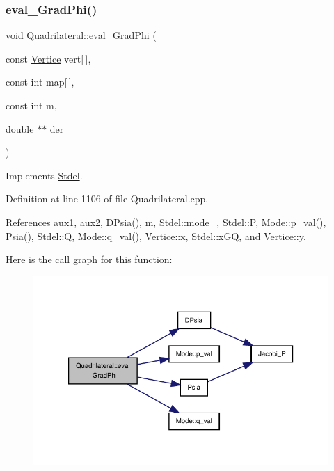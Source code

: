 \subsubsection{\texorpdfstring{eval\+\_\+\+Grad\+Phi()}{eval\_GradPhi()}}
{\footnotesize\ttfamily void Quadrilateral\+::eval\+\_\+\+Grad\+Phi (\begin{DoxyParamCaption}\item[{const \hyperlink{structVertice}{Vertice}}]{vert\mbox{[}$\,$\mbox{]},  }\item[{const int}]{map\mbox{[}$\,$\mbox{]},  }\item[{const int}]{m,  }\item[{double $\ast$$\ast$}]{der }\end{DoxyParamCaption})\hspace{0.3cm}{\ttfamily [virtual]}}



Implements \hyperlink{classStdel_a83a7a53e4be6da7c3a615967e4504b07}{Stdel}.



Definition at line 1106 of file Quadrilateral.\+cpp.



References aux1, aux2, D\+Psia(), m, Stdel\+::mode\+\_\+, Stdel\+::P, Mode\+::p\+\_\+val(), Psia(), Stdel\+::Q, Mode\+::q\+\_\+val(), Vertice\+::x, Stdel\+::x\+GQ, and Vertice\+::y.

Here is the call graph for this function\+:
\nopagebreak
\begin{figure}[H]
\begin{center}
\leavevmode
\includegraphics[width=333pt]{classQuadrilateral_a36182bade5a366259a236faa2061d8cb_cgraph}
\end{center}
\end{figure}
\mbox{\label{classQuadrilateral_a90d47786b93b255c1c777f0d35eddccb}} 

